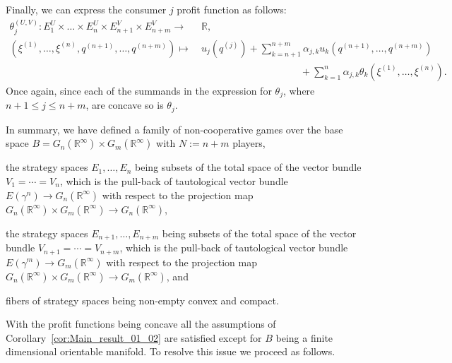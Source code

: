 \documentclass[a4paper,11pt,reqno,english]{amsart}
\theoremstyle{plain}
\theoremstyle{definition}
\begin{document}
Finally, we can express the consumer $j$ profit function as follows:
\begin{align*}
	\theta_j^{(U,V)} \colon E_1^U\times\dots\times E_n^U\times E_{n+1}^V\times   E_{n+m}^V\longrightarrow \  & \mathbb{R},                                                                                     \\
	(\xi^{(1)},\dots,\xi^{(n)},q^{(n+1)},\dots,q^{(n+m)}) \longmapsto \                                      &
	u_j(q^{(j)}) + \sum_{k=n+1}^{n+m} \alpha_{j,k}u_k(q^{(n+1)},\dots,q^{(n+m)})                                                                                                                               \\
	                                                                                                         & \qquad\qquad\qquad\qquad\qquad +\sum_{k=1}^{n} \alpha_{j,k}\theta_k(\xi^{(1)},\dots,\xi^{(n)}).
\end{align*}
Once again, since each of the summands in the expression for $\theta_j$, where $n+1\leq j\leq n+m$, are concave so is $\theta_j$.

\medskip
In summary, we have defined a family of non-cooperative games over the base space $B= G_n(\mathbb{R}^{\infty})\times G_m(\mathbb{R}^{\infty})$ with $N:=n+m$ players,
\begin{compactitem}[\quad --]
	\item the strategy spaces $E_1,\dots,E_n$ being subsets of the total space of the vector bundle $V_1=\cdots=V_n$, which is the pull-back of tautological vector bundle $E(\gamma^n)\longrightarrow G_n(\mathbb{R}^{\infty})$ with respect to the projection map $G_n(\mathbb{R}^{\infty})\times G_m(\mathbb{R}^{\infty})\longrightarrow G_n(\mathbb{R}^{\infty})$,
	\item the strategy spaces $E_{n+1},\dots,E_{n+m}$ being subsets of the total space of the vector bundle $V_{n+1}=\cdots=V_{n+m}$, which is the pull-back of tautological vector bundle $E(\gamma^m)\longrightarrow G_m(\mathbb{R}^{\infty})$ with respect to the projection map $G_n(\mathbb{R}^{\infty})\times G_m(\mathbb{R}^{\infty})\longrightarrow G_m(\mathbb{R}^{\infty})$, and
	\item fibers of strategy spaces being non-empty convex and compact.
\end{compactitem}
With the profit functions being concave all the assumptions of Corollary~\ref{cor:Main_result_01_02} are satisfied except for $B$ being a finite dimensional orientable manifold.
To resolve this issue we proceed as follows.
\end{document}
